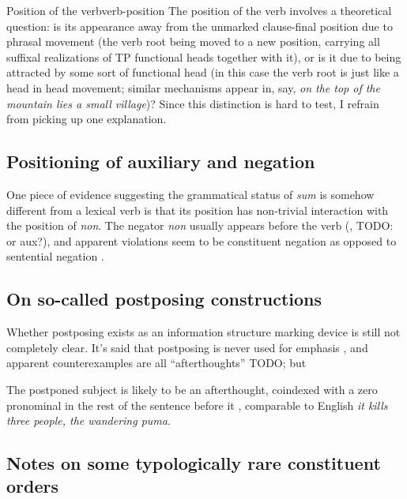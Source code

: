 \documentclass[a4paper, oneside, 12pt]{report}
\newcommand*{\citesec}[1]{\S~{#1}}
\newcommand*{\citepage}[1]{p.~{#1}}
\newcommand{\form}[1]{\emph{#1}}
\begin{document}
\begin{infobox}{Position of the verb}{verb-position}
    The position of the verb involves a theoretical question:
    is its appearance away from the unmarked clause-final position
    due to phrasal movement 
    (the verb root being moved to a new position, 
    carrying all suffixal realizations of 
    TP functional heads together with it),
    or is it due to being attracted by some sort of functional head
    (in this case the verb root is just like a head in head movement;
    similar mechanisms appear in, say, 
    \form{on the top of the mountain \emph{lies} a small village})?
    Since this distinction is hard to test, 
    I refrain from picking up one explanation.
\end{infobox}

\subsection{Positioning of auxiliary and negation}\label{sec:constituent-order.aux-neg}



One piece of evidence suggesting the grammatical status of \form{sum} 
is somehow different from a lexical verb 
is that its position has non-trivial interaction 
with the position of \form{non}.
The negator \form{non} usually appears before the verb 
(\citealt[\citesec{1.5}]{danckaert2017development}, TODO: or aux?),
and apparent violations seem to be constituent negation 
as opposed to sentential negation \citep[\citepage{43}]{danckaert2017development}.

\subsection{On so-called postposing constructions}

Whether postposing exists as an information structure marking device 
is still not completely clear. 
It's said that postposing is never used for emphasis \citep[\citepage{395}]{allen1903allen},
and apparent counterexamples are all ``afterthoughts'' TODO;
but 

The postponed subject is likely to be an afterthought, 
coindexed with a zero pronominal 
in the rest of the sentence before it
\citet[\citepage{87}]{devine2006latin},
comparable to English \form{it kills three people, the wandering puma}.

\subsection{Notes on some typologically rare constituent orders}
\end{document}
